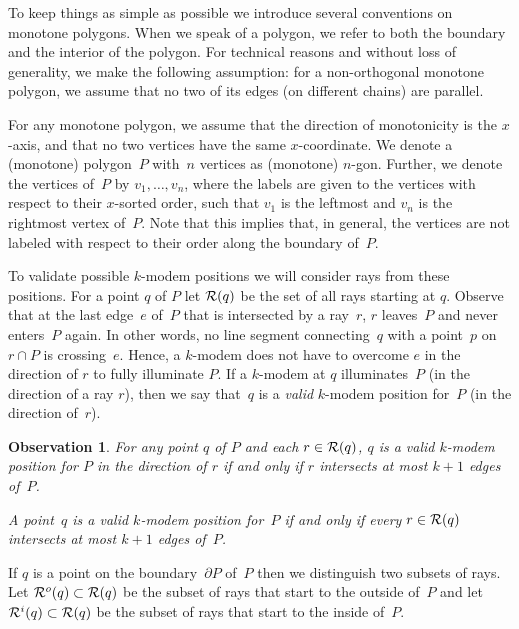 \documentclass[A4]{article}
\newtheorem{observation}[theorem]{Observation}
\begin{document}
To keep things as simple as possible we introduce several conventions on monotone polygons.
When we speak of a polygon, we refer to both the boundary and the interior of the polygon.
For technical reasons and without loss of generality, we make the following assumption: for a non-ortho\-gonal monotone polygon, we assume that no two of its edges (on different chains) are parallel. 


For any monotone polygon, we assume that the direction of monotonicity is the \mbox{$x$-axis}, and that no two vertices have the same $x$-coordinate.
We denote a (monotone) polygon~$P$ with~$n$ vertices as (monotone) \mbox{$n$-gon}.
Further, we denote the vertices of~$P$ by $v_1, \ldots, v_{n}$, where the labels are given to the vertices with respect to their $x$-sorted order, such that $v_1$ is the leftmost and $v_{n}$ is the rightmost vertex of~$P$.
Note that this implies that, in general, the vertices are not labeled with respect to their order along the boundary of~$P$. 


To validate possible \mbox{$k$-modem} positions we will consider rays from these positions.
For a point $q$ of $P$ let ${\cal R}(q)$ be the set of all rays starting at $q$.
Observe that at the last edge~$e$ of~$P$ that is intersected by a ray~$r$, $r$ leaves~$P$ and never enters~$P$ again.
In other words, no line segment connecting~$q$ with a point~$p$ on~$r\cap P$ is crossing~$e$.
Hence, a \mbox{$k$-modem} does not have to overcome $e$ in the direction of $r$ to fully illuminate $P$.
If a \mbox{$k$-modem} at $q$ illuminates~$P$ (in the direction of a ray $r$), then we say that~$q$ is a \emph{valid} \mbox{$k$-modem} position for~$P$ (in the direction of~$r$).


\begin{observation}\label{obs:rayk+1}
For any point $q$ of $P$ and each $r\in{\cal R}(q)$, $q$ is a valid \mbox{$k$-modem} position for $P$ in the direction of $r$ if and only if $r$ intersects at most $k+1$ edges of~$P$.

A point~$q$ is a valid \mbox{$k$-modem} position for~$P$ if and only if every $r\in{\cal R}(q)$ intersects at most $k+1$ edges of~$P$.
\end{observation}

If $q$ is a point on the boundary~$\partial P$ of~$P$ then we distinguish two subsets of rays.
Let ${\cal R}^o(q)\subset {\cal R}(q)$ be the subset of rays that start to the outside of~$P$ and let ${\cal R}^i(q)\subset {\cal R}(q)$ be the subset of rays that start to the inside of~$P$.
\end{document}
